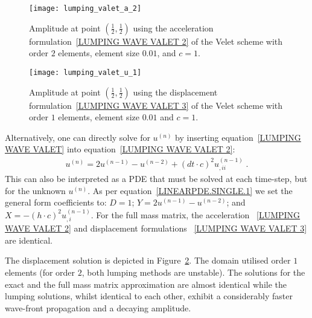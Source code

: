 \begin{figure}[ht]
\centerline{\texttt{[image: lumping\_valet\_a\_2]}}
\caption{Amplitude at point $(\frac{1}{2},\frac{1}{2})$ using the acceleration formulation~\ref{LUMPING WAVE VALET 2} of the 
Velet scheme with order $2$ elements, element size $0.01$, and $c=1$.}
\label{FIG LUMPING VALET B}
\end{figure}

\begin{figure}[ht]
\centerline{\texttt{[image: lumping\_valet\_u\_1]}}
\caption{Amplitude at point $(\frac{1}{2},\frac{1}{2})$ using the displacement formulation~\ref{LUMPING WAVE VALET 3} of the 
Velet scheme with order $1$ elements, element size $0.01$ and $c=1$.}
\label{FIG LUMPING VALET C}
\end{figure}

Alternatively, one can directly solve for $u^{(n)}$ by inserting 
equation~\ref{LUMPING WAVE VALET} into equation~\ref{LUMPING WAVE VALET 2}:
\begin{eqnarray} \label{LUMPING WAVE VALET 3} 
u^{(n)}=2u^{(n-1)}-u^{(n-2)} + (dt\cdot c)^2 u^{(n-1)}_{,ii} \; .
\end{eqnarray}
This can also be interpreted as a PDE that must be solved at each time-step, but 
for the unknown $u^{(n)}$. 
As per equation~\ref{LINEARPDE.SINGLE.1} we set the general form coefficients to:
$D=1$; $Y=2u^{(n-1)}-u^{(n-2)}$; and $X=-(h\cdot c)^2 u^{(n-1)}_{,i}$. 
For the full mass matrix, the acceleration ~\ref{LUMPING WAVE VALET 2} and displacement formulations ~\ref{LUMPING WAVE VALET 3}
are identical. 

The displacement solution is depicted in Figure~\ref{FIG LUMPING VALET C}. The
domain utilised order $1$ elements (for order $2$, both 
lumping methods are unstable). The solutions for the exact and the full mass 
matrix approximation are almost identical while the lumping solutions, whilst 
identical to each other, exhibit a considerably faster wave-front propagation 
and a decaying amplitude.

